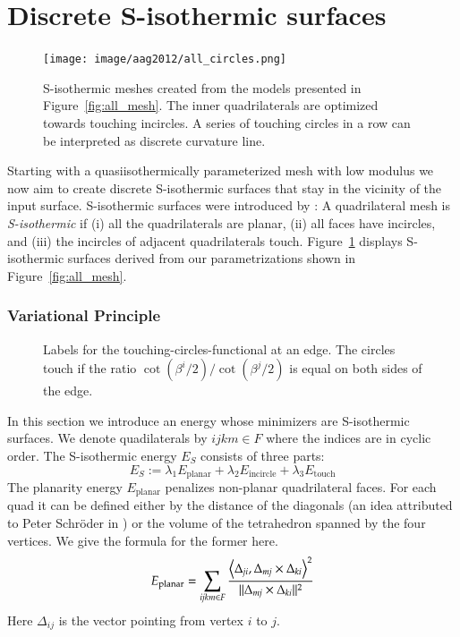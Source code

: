 \documentclass[Thesis.tex]{subfiles}
\begin{document}
\section{Discrete S-isothermic surfaces}
\label{sec:s-isothermic}

\begin{figure}
\centering
\texttt{[image: image/aag2012/all\_circles.png]}
\caption[S-isothermic meshes]{S-isothermic meshes created from the models presented in
Figure~\ref{fig:all_mesh}.
The inner quadrilaterals are optimized towards touching incircles. A series of
touching circles in a row can be interpreted as discrete curvature line.}
\label{fig:s_isothermic}
\end{figure}

Starting with a quasiisothermically parameterized mesh with low modulus 
we now aim to create discrete S-isothermic surfaces that
stay in the vicinity of the input surface. S-isothermic surfaces were
introduced by \cite{BobenkoP1996}: A quadrilateral mesh
is \mbox{\emph{S-isothermic}} if (i) all the quadrilaterals are planar, (ii)
all faces have incircles, and (iii) the incircles of adjacent quadrilaterals
touch.
Figure~\ref{fig:s_isothermic} displays S-isothermic surfaces derived from our
parametrizations shown in Figure~\ref{fig:all_mesh}.

\subsubsection{Variational Principle}

\begin{figure}
\centering
\resizebox{0.4\textwidth}{!}{}
\caption{Labels for the touching-circles-functional at an edge. The circles touch 
if the ratio $\cot\left(\beta^i/2\right)/\cot\left(\beta^j/2\right)$ is equal on both sides of the edge.}
\label{fig:functional}
\end{figure}

In this section we introduce an energy whose minimizers are S-isothermic
surfaces. We denote quadilaterals by $ijkm\in F$ where the indices are in 
cyclic order.
The S-isothermic energy $E_S$ consists of three parts:
\begin{equation}
  E_S := 
  \lambda_1 E_{\mathrm{planar}} + 
  \lambda_2 E_{\mathrm{incircle}} + 
  \lambda_3 E_{\mathrm{touch}}
\end{equation}
The planarity energy $E_{\mathrm{planar}}$ penalizes non-planar quadrilateral
faces. For each quad it can be defined either by the distance of the diagonals
(an idea attributed to Peter Schr\"oder in \cite{PottmannSBSWBW2008}) or the
volume of the tetrahedron spanned by the
four vertices. We give the formula for the former here. 
\begin{equation}
E_{\mathrm{planar}} = \sum_{\mathrm{\it{ijkm}} \in F} \frac{\left<\Delta_{\mathrm{\it{ji}}},\Delta_{\mathrm{\it{mj}}} \times \Delta_{\mathrm{\it{ki}}}\right>^2}
{\Vert\Delta_{\mathrm{\it{mj}}} \times \Delta_{\mathrm{\it{ki}}}\Vert^2}
\end{equation}
Here $\Delta_{ij}$ is the vector pointing from vertex $i$ to $j$.
\end{document}
